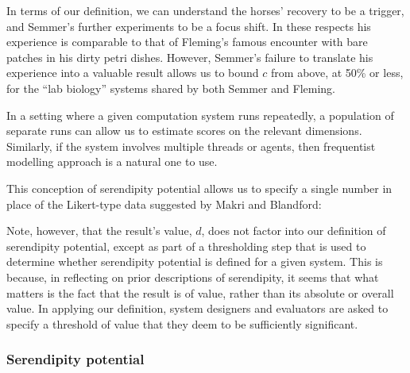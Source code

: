 In terms of our definition, we can understand the horses' recovery to
be a trigger, and Semmer's further experiments to be a focus
shift.  In these respects his experience is comparable to that
of Fleming's famous encounter with bare patches in his dirty petri dishes.
However, Semmer's failure to translate his experience into a valuable
result allows us to bound $c$ from above, at 50\% or less,
for the ``lab biology'' systems shared by both Semmer and Fleming.

In a setting where a given computation system runs repeatedly, a
population of separate runs can allow us to estimate scores on the
relevant dimensions.  Similarly, if the system involves multiple
threads or agents, then frequentist modelling approach is a natural one
to use.

This conception of serendipity potential allows us to specify a single
number in place of the Likert-type data suggested by Makri and
Blandford:
\vspace{-\baselineskip}

Note, however, that the result's value, $d$, does not factor into our
definition of serendipity potential, except as part of a thresholding
step that is used to determine whether serendipity potential is
defined for a given system.  This is because, in reflecting on prior
descriptions of serendipity, it seems that what matters is the fact that
the result is of value, rather than its absolute or overall value.  In applying our
definition, system designers and evaluators are asked to specify a
threshold of value that they deem to be sufficiently significant.

\subsubsection{Serendipity potential}

